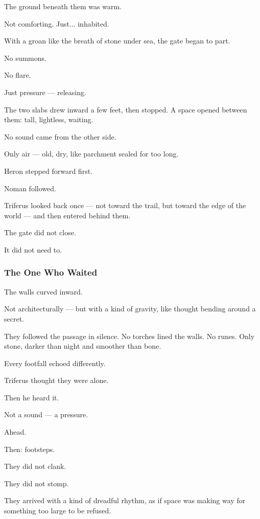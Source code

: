 \documentclass[12pt]{article}
\begin{document}
The ground beneath them was warm.

Not comforting. Just... inhabited.

\bigskip

With a groan like the breath of stone under sea, the gate began to part.

No summons.

No flare.

Just pressure — releasing.

The two slabs drew inward a few feet, then stopped. A space opened between them: tall, lightless, waiting.

No sound came from the other side.

Only air — old, dry, like parchment sealed for too long.

Heron stepped forward first.

Noman followed.

Triferus looked back once — not toward the trail, but toward the edge of the world — and then entered behind them.

\bigskip

The gate did not close.

It did not need to.

\dotfill

\subsubsection{The One Who Waited}

The walls curved inward.

Not architecturally — but with a kind of gravity, like thought bending around a secret.

They followed the passage in silence. No torches lined the walls. No runes. Only stone, darker than night and smoother than bone.

Every footfall echoed differently.

Triferus thought they were alone.

Then he heard it.

Not a sound — a pressure.

Ahead.

Then: footsteps.

\bigskip

They did not clank.

They did not stomp.

They arrived with a kind of dreadful rhythm, as if space was making way for something too large to be refused.
\end{document}
